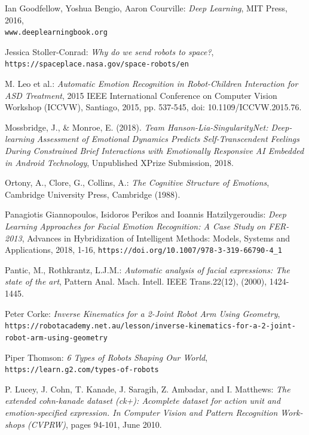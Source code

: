 \documentclass[runningheads,a4paper,12pt]{report}
\begin{document}
\begin{thebibliography}{9}
Ian Goodfellow, Yoshua Bengio, Aaron Courville:
\textit{Deep Learning},
MIT Press,
2016,
\\\texttt{www.deeplearningbook.org}

Jessica Stoller-Conrad:
\textit{Why do we send robots to space?}, 
\texttt{https://spaceplace.nasa.gov/space-robots/en}

M. Leo et al.:
\textit{Automatic Emotion Recognition in Robot-Children Interaction for ASD Treatment},
2015 IEEE International Conference on Computer Vision Workshop (ICCVW), Santiago, 2015, pp. 537-545, doi: 10.1109/ICCVW.2015.76.

Mossbridge, J., \& Monroe, E. (2018). 
\textit{Team Hanson-Lia-SingularityNet: Deep-learning Assessment of Emotional Dynamics Predicts Self-Transcendent Feelings During Constrained Brief Interactions with Emotionally Responsive AI Embedded in Android Technology},
Unpublished XPrize Submission, 2018.

Ortony, A., Clore, G., Collins, A.: 
\textit{The Cognitive Structure of Emotions}, Cambridge University Press, Cambridge (1988).

Panagiotis Giannopoulos, Isidoros Perikos and Ioannis Hatzilygeroudis:
\textit{Deep Learning Approaches for Facial Emotion Recognition: A Case Study on FER-2013}, 
Advances in Hybridization of Intelligent Methods: Models, Systems and Applications, 2018, 1-16,
\texttt{https://doi.org/10.1007/978-3-319-66790-4\_1}

Pantic, M., Rothkrantz, L.J.M.: 
\textit{Automatic analysis of facial expressions: The state of the art}, 
Pattern Anal. Mach. Intell. IEEE Trans.22(12), (2000), 1424-1445.

Peter Corke:
\textit{Inverse Kinematics for a 2-Joint Robot Arm Using Geometry},
\texttt{https://robotacademy.net.au/lesson/inverse-kinematics-for-a-2-joint-robot-arm-using-geometry}

Piper Thomson:
\textit{6 Types of Robots Shaping Our World},
\texttt{https://learn.g2.com/types-of-robots}

P. Lucey, J. Cohn, T. Kanade, J. Saragih, Z. Ambadar, and I. Matthews:
\textit{The extended cohn-kanade dataset (ck+): Acomplete dataset for action unit and emotion-specified expression. In Computer Vision and Pattern Recognition Work-shops (CVPRW)}, pages 94-101, June 2010.


\end{thebibliography}
\end{document}
